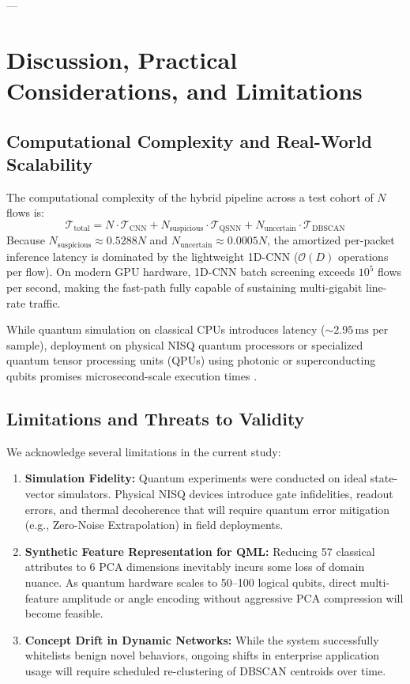 \documentclass[preprint,12pt]{elsarticle}
\begin{document}
---

\section{Discussion, Practical Considerations, and Limitations}
\label{sec:discussion}

\subsection{Computational Complexity and Real-World Scalability}
The computational complexity of the hybrid pipeline across a test cohort of $N$ flows is:
\begin{equation}
    \mathcal{T}_{\text{total}} = N \cdot \mathcal{T}_{\text{CNN}} + N_{\text{suspicious}} \cdot \mathcal{T}_{\text{QSNN}} + N_{\text{uncertain}} \cdot \mathcal{T}_{\text{DBSCAN}}
\end{equation}
Because $N_{\text{suspicious}} \approx 0.5288 N$ and $N_{\text{uncertain}} \approx 0.0005 N$, the amortized per-packet inference latency is dominated by the lightweight 1D-CNN ($\mathcal{O}(D)$ operations per flow). On modern GPU hardware, 1D-CNN batch screening exceeds $10^5$ flows per second, making the fast-path fully capable of sustaining multi-gigabit line-rate traffic.

While quantum simulation on classical CPUs introduces latency ($\sim 2.95\,\text{ms}$ per sample), deployment on physical NISQ quantum processors or specialized quantum tensor processing units (QPUs) using photonic or superconducting qubits promises microsecond-scale execution times \cite{arute2019quantum}.

\subsection{Limitations and Threats to Validity}
We acknowledge several limitations in the current study:
\begin{enumerate}
    \item \textbf{Simulation Fidelity:} Quantum experiments were conducted on ideal state-vector simulators. Physical NISQ devices introduce gate infidelities, readout errors, and thermal decoherence that will require quantum error mitigation (e.g., Zero-Noise Extrapolation) in field deployments.
    \item \textbf{Synthetic Feature Representation for QML:} Reducing 57 classical attributes to 6 PCA dimensions inevitably incurs some loss of domain nuance. As quantum hardware scales to 50--100 logical qubits, direct multi-feature amplitude or angle encoding without aggressive PCA compression will become feasible.
    \item \textbf{Concept Drift in Dynamic Networks:} While the system successfully whitelists benign novel behaviors, ongoing shifts in enterprise application usage will require scheduled re-clustering of DBSCAN centroids over time.
\end{enumerate}
\end{document}
